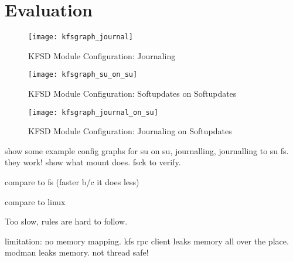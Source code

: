 \section{Evaluation}
\label{sec:eval}

\newcommand{\kfsgraphscale}{0.3}

\begin{figure}[htb]
\begin{center}
  \texttt{[image: kfsgraph\_journal]}
  \label{fig:kfsgraph-journal}
  \caption{KFSD Module Configuration: Journaling}
\end{center}
\end{figure}

\begin{figure}[htb]
\begin{center}
  \texttt{[image: kfsgraph\_su\_on\_su]}
  \label{fig:kfsgraph-su-on-su}
  \caption{KFSD Module Configuration: Softupdates on Softupdates}
\end{center}
\end{figure}

\begin{figure}[htb]
\begin{center}
  \texttt{[image: kfsgraph\_journal\_on\_su]}
  \label{fig:kfsgraph-journal-on-su}
  \caption{KFSD Module Configuration: Journaling on Softupdates}
\end{center}
\end{figure}

show some example config graphs for su on su, journalling, journalling
to su fs. they work! show what mount does. fsck to verify.

compare to fs (faster b/c it does less)

compare to linux

Too slow, rules are hard to follow.

limitation: no memory mapping. kfs rpc client leaks memory all over
the place. modman leaks memory. not thread safe!
